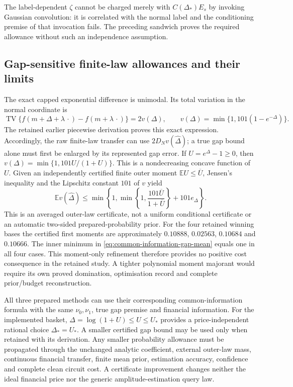 \documentclass[11pt]{article}
\begin{document}
The label-dependent $\zeta$ cannot be charged merely with
$C(\Delta_*)E_s$ by invoking Gaussian convolution: it is correlated with
the normal label and the conditioning premise of that invocation fails.
The preceding sandwich proves the required allowance without such an
independence assumption.

\subsection{Gap-sensitive finite-law allowances and their limits}

The exact capped exponential difference is unimodal. Its total variation
in the normal coordinate is
\begin{equation}
 \operatorname{TV}\{f(m+\Delta+\lambda\,\cdot)-f(m+\lambda\,\cdot)\}
 =2v(\Delta),\qquad
 v(\Delta)=\min\{1,101(1-e^{-\Delta})\}.
 \label{eq:common-information-gap-variation}
\end{equation}
The retained earlier piecewise derivation proves this exact expression.
Accordingly, the raw finite-law transfer can use
$2D_Nv(\widehat\Delta)$; a true gap bound alone must first be enlarged
by its represented gap error. If $U=e^\Delta-1\geq0$, then
$v(\Delta)=\min\{1,101U/(1+U)\}$. This is a nondecreasing concave
function of $U$. Given an independently certified finite outer moment
$\mathbb E U\leq\overline U$, Jensen's inequality and the Lipschitz
constant $101$ of $v$ yield
\begin{equation}
 \mathbb E v(\widehat\Delta)
 \leq\min\left\{1,
       \min\left\{1,\frac{101\overline U}{1+\overline U}\right\}
                   +101e_\Delta\right\}.
 \label{eq:common-information-gap-mean}
\end{equation}
This is an averaged outer-law certificate, not a uniform conditional
certificate or an automatic two-sided prepared-probability prior.
For the four retained winning bases the certified first moments are
approximately $0.10888$, $0.02563$, $0.10684$ and $0.10666$.
The inner minimum in \eqref{eq:common-information-gap-mean} equals one
in all four cases. This moment-only refinement therefore provides no
positive cost consequence in the retained study. A tighter polynomial
moment majorant would require its own proved domination, optimisation
record and complete prior/budget reconstruction.

All three prepared methods can use their corresponding common-information
formula with the same $\nu_0,\nu_1$, true gap premise and financial
information. For the implemented basket, $\Delta=\log(1+U)\leq U\leq U_*$
provides a price-independent rational choice $\Delta_*=U_*$. A smaller
certified gap bound may be used only when retained with its derivation.
Any smaller probability allowance must be propagated through the
unchanged analytic coefficient, external outer-law mass, continuous
financial transfer, finite mean prior, estimation accuracy, confidence
and complete clean circuit cost. A certificate improvement changes
neither the ideal financial price nor the generic amplitude-estimation
query law.
\end{document}
